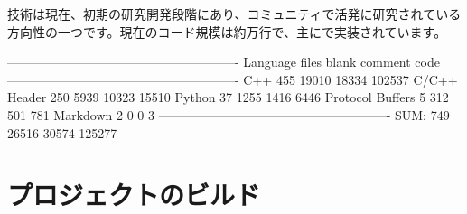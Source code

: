 \begin{content}
技術は現在、初期の研究開発段階にあり、\tf{}コミュニティで活発に研究されている方向性の一つです。現在のコード規模は約万行で、主にで実装されています。

\begin{leftbar}
\begin{python}[caption={Compilerコード統計}]
-------------------------------------------------------
Language            files     blank   comment      code
-------------------------------------------------------
C++                   455     19010     18334    102537
C/C++ Header          250      5939     10323     15510
Python                 37      1255      1416      6446
Protocol Buffers        5       312       501       781
Markdown                2         0         0         3
-------------------------------------------------------
SUM:                  749     26516     30574    125277
-------------------------------------------------------
\end{python}
\end{leftbar}

\end{content}

\section{プロジェクトのビルド}

